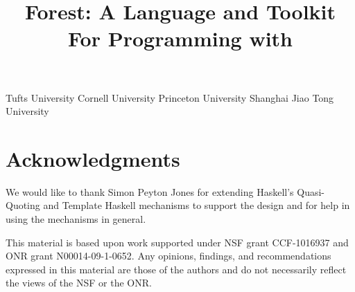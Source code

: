 \documentclass[nocopyrightspace,natbib,preprint]{sigplanconf}
\newif\ifappendix\appendixfalse  %
\newif\ifanon\anonfalse          %
\begin{document}


\copyrightdata{} 

\title{Forest: A Language and Toolkit For Programming with \Filestores{}}

\ifanon
\authorinfo{\vskip -2in}
 	   {\vskip -2in}
           {}
\else
{}
	   {Tufts University}{}
           {Cornell University}{}
           {Princeton University}{}
           {Shanghai Jiao Tong University}{}
\fi

\maketitle{}

\begin{abstract}  

\end{abstract}












\section*{Acknowledgments}
We would like to thank Simon Peyton Jones for extending Haskell's
Quasi-Quoting and Template Haskell mechanisms to support the \forest{}
design and for help in using the mechanisms in general.

This material is based upon work supported under NSF grant CCF-1016937
and ONR grant N00014-09-1-0652. Any opinions, findings, and
recommendations expressed in this material are those of the authors
and do not necessarily reflect the views of the NSF or the ONR.




\ifappendix
\onecolumn
\newpage
\appendix

\closeproofchan
\section{Proofs}

\noindent This appendix contains the proofs of the theorems stated in
Section~\ref{sec:theory}.

\label{sec:proof-appendix}



\fi
\end{document}
